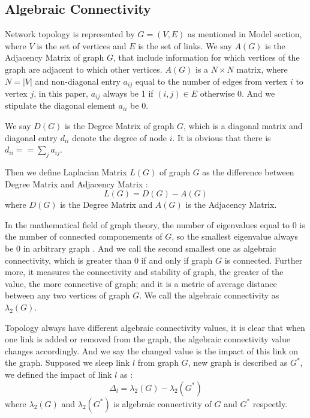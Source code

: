 \documentclass[conference]{IEEEtran}
\begin{document}
\subsection{Algebraic Connectivity}
Network topology is represented by $G = (V, E)$ as mentioned in Model section, where $V$ is the set of vertices
and $E$ is the set of links. We say $A(G)$ is the Adjacency Matrix of graph $G$, that include information for which
vertices of the graph are adjacent to which other vertices. $A(G)$ is a $N \times N$ matrix, where
$N = |V|$ and non-diagonal entry $a_{ij}$ equal to the number of edges from vertex $i$ to vertex $j$, in this paper,
$a_{ij}$ always be 1 if $(i,j) \in E$ otherwise 0. And we stipulate the diagonal element $a_{ii}$ be 0.


We say $D(G)$ is the Degree Matrix of graph $G$, which is a diagonal matrix and diagonal entry $d_{ii}$ denote 
the degree of node $i$. It is obvious that there is $d_{ii} == \sum_{j} a_{ij}$.


Then we define Laplacian Matrix $L(G)$ of graph $G$ as the difference between Degree Matrix and Adjacency Matrix :
\begin{equation}
	L(G) = D(G) - A(G)
\end{equation}
where $D(G)$ is the Degree Matrix and $A(G)$ is the Adjacency Matrix.


In the mathematical field of graph theory, the number of eigenvalues equal to 0 is the number of connected 
componements of $G$, so the smallest eigenvalue always be 0 in arbitrary graph . And we call the second smallest one as
algebraic connectivity, which is greater than 0 if and only if graph $G$ is connected. Further more,  
it measures the connectivity and stability of graph, the greater of the value, the more connective of graph;
and it is a metric of average distance between any two vertices of graph $G$. We call the algebraic connectivity as
$\lambda_2(G)$.


Topology always have different algebraic connectivity values, it is clear that when one link is added or 
removed from the graph, the algebraic connectivity value changes accordingly. And we say the changed value
is the impact of this link on the graph. Supposed we sleep link $l$ from graph $G$, new graph is described as $G^*$, 
we defined the impact of link $l$ as :
\begin{equation}
	\Delta_l = \lambda_2(G) - \lambda_2(G^*)
\end{equation}
where $\lambda_2(G)$ and $\lambda_2(G^*)$ is algebraic connectivity of $G$ and $G^*$ respectly.
\end{document}

